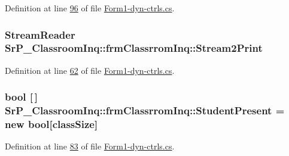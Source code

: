 \-Definition at line \hyperlink{_form1-dyn-ctrls_8cs_source_l00096}{96} of file \hyperlink{_form1-dyn-ctrls_8cs_source}{\-Form1-\/dyn-\/ctrls.\-cs}.

\hypertarget{class_sr_p___classroom_inq_1_1frm_classrrom_inq_aa030f46a7915eae3a0b8b88661be51a8}{
\subsubsection[{\-Stream2\-Print}]{\setlength{\rightskip}{0pt plus 5cm}\-Stream\-Reader {\bf \-Sr\-P\-\_\-\-Classroom\-Inq\-::frm\-Classrrom\-Inq\-::\-Stream2\-Print}}}
\label{class_sr_p___classroom_inq_1_1frm_classrrom_inq_aa030f46a7915eae3a0b8b88661be51a8}


\-Definition at line \hyperlink{_form1-dyn-ctrls_8cs_source_l00062}{62} of file \hyperlink{_form1-dyn-ctrls_8cs_source}{\-Form1-\/dyn-\/ctrls.\-cs}.

\hypertarget{class_sr_p___classroom_inq_1_1frm_classrrom_inq_aa5c7b55e4b30e09f574c44e90b06e7b2}{
\subsubsection[{\-Student\-Present}]{\setlength{\rightskip}{0pt plus 5cm}bool \mbox{[}$\,$\mbox{]} {\bf \-Sr\-P\-\_\-\-Classroom\-Inq\-::frm\-Classrrom\-Inq\-::\-Student\-Present} = new bool\mbox{[}{\bf class\-Size}\mbox{]}}}
\label{class_sr_p___classroom_inq_1_1frm_classrrom_inq_aa5c7b55e4b30e09f574c44e90b06e7b2}


\-Definition at line \hyperlink{_form1-dyn-ctrls_8cs_source_l00083}{83} of file \hyperlink{_form1-dyn-ctrls_8cs_source}{\-Form1-\/dyn-\/ctrls.\-cs}.

